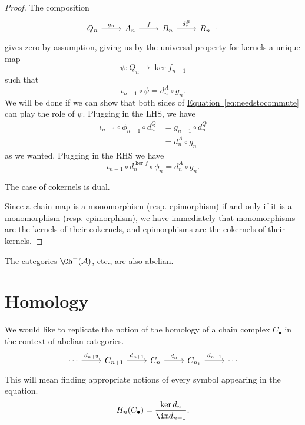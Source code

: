 \documentclass[main.tex]{subfiles}
\begin{document}
\begin{proof}
  The composition
  \begin{equation*}
    \begin{tikzcd}
      Q_{n}
      \arrow[r, "g_{n}"]
      & A_{n}
      \arrow[r, "f"]
      & B_{n}
      \arrow[r, "d_{n}^{B}"]
      & B_{n-1}
    \end{tikzcd}
  \end{equation*}
  gives zero by assumption, giving us by the universal property for kernels a unique map
  \begin{equation*}
    \psi\colon Q_{n} \to \ker f_{n-1}
  \end{equation*}
  such that
  \begin{equation*}
    \iota_{n-1} \circ \psi = d^{A}_{n} \circ g_{n}.
  \end{equation*}
  We will be done if we can show that both sides of \hyperref[eq:needstocommute]{Equation~\ref*{eq:needstocommute}} can play the role of $\psi$. Plugging in the LHS, we have
  \begin{align*}
    \iota_{n-1} \circ \phi_{n-1} \circ d^{Q}_{n} &= g_{n-1} \circ d^{Q}_{n} \\
    &= d^{A}_{n} \circ g_{n}
  \end{align*}
  as we wanted. Plugging in the RHS we have
  \begin{equation*}
    \iota_{n-1} \circ d^{\ker f}_{n} \circ \phi_{n} = d^{A}_{n} \circ g_{n}.
  \end{equation*}

  The case of cokernels is dual.

  Since a chain map is a monomorphism (resp. epimorphism) if and only if it is a monomorphism (resp. epimorphism), we have immediately that monomorphisms are the kernels of their cokernels, and epimorphisms are the cokernels of their kernels.
\end{proof}

The categories $\Ch^{+}(\mathcal{A})$, etc., are also abelian.

\section{Homology}
\label{sec:homology}

We would like to replicate the notion of the homology of a chain complex $C_{\bullet}$ in the context of abelian categories.
\begin{equation*}
  \begin{tikzcd}
    \cdots
    \arrow[r, "d_{n+2}"]
    & C_{n+1}
    \arrow[r, "d_{n+1}"]
    & C_{n}
    \arrow[r, "d_{n}"]
    & C_{n_1}
    \arrow[r, "d_{n-1}"]
    & \cdots
  \end{tikzcd}
\end{equation*}
This will mean finding appropriate notions of every symbol appearing in the equation.
\begin{equation*}
  H_{n}(C_{\bullet}) = \frac{\ker d_{n}}{\im d_{n+1}}.
\end{equation*}
\end{document}
